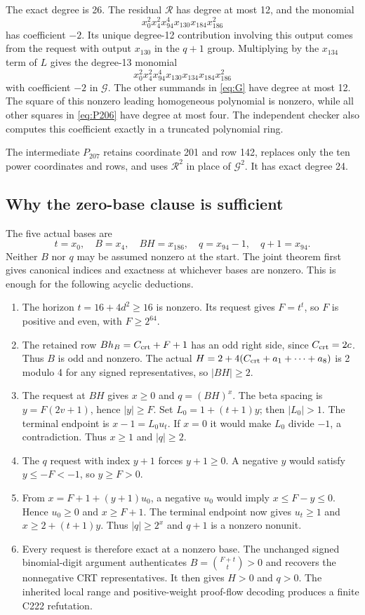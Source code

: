 \documentclass[11pt]{article}
\theoremstyle{definition}\newtheorem{definition}[theorem]{Definition}
\begin{document}
The exact degree is 26. The residual $\mathcal R$ has degree at most 12,
and the monomial
\[
 x_0^2x_4^2x_{94}^4x_{130}x_{184}x_{186}^2
\]
has coefficient $-2$. Its unique degree-12 contribution involving this
output comes from the request with output $x_{130}$ in the $q+1$ group.
Multiplying by the $x_{134}$ term of $L$ gives the degree-13 monomial
\[
 x_0^2x_4^2x_{94}^4x_{130}x_{134}x_{184}x_{186}^2
\]
with coefficient $-2$ in $\mathcal G$. The other summands in
\eqref{eq:G} have degree at most 12. The square of this nonzero leading
homogeneous polynomial is nonzero, while all other squares in
\eqref{eq:P206} have degree at most four. The independent checker also
computes this coefficient exactly in a truncated polynomial ring.

The intermediate $P_{207}$ retains coordinate 201 and row 142, replaces
only the ten power coordinates and rows, and uses $\mathcal R^2$ in
place of $\mathcal G^2$. It has exact degree 24.

\subsection{Why the zero-base clause is sufficient}

The five actual bases are
\[
 t=x_0,\quad B=x_4,\quad BH=x_{186},\quad q=x_{94}-1,
 \quad q+1=x_{94}.
\]
Neither $B$ nor $q$ may be assumed nonzero at the start. The joint
theorem first gives canonical indices and exactness at whichever bases
are nonzero. This is enough for the following acyclic deductions.

\begin{enumerate}
\item The horizon $t=16+4d^2\ge16$ is nonzero. Its request gives
 $F=t^t$, so $F$ is positive and even, with $F\ge2^{64}$.
\item The retained row $Bh_B=C_{\rm crt}+F+1$ has an odd right side,
 since $C_{\rm crt}=2c$. Thus $B$ is odd and nonzero. The actual
 $H=2+4(C_{\rm crt}+a_1+\cdots+a_8)$ is 2 modulo 4 for any signed
 representatives, so $|BH|\ge2$.
\item The request at $BH$ gives $x\ge0$ and $q=(BH)^x$. The beta
 spacing is $y=F(2v+1)$, hence $|y|\ge F$. Set $L_0=1+(t+1)y$;
 then $|L_0|>1$. The terminal endpoint is $x-1=L_0u_t$.
 If $x=0$ it would make $L_0$ divide $-1$, a contradiction.
 Thus $x\ge1$ and $|q|\ge2$.
\item The $q$ request with index $y+1$ forces $y+1\ge0$.
 A negative $y$ would satisfy $y\le-F<-1$, so $y\ge F>0$.
\item From $x=F+1+(y+1)u_0$, a negative $u_0$ would imply
 $x\le F-y\le0$. Hence $u_0\ge0$ and $x\ge F+1$.
 The terminal endpoint now gives $u_t\ge1$ and
 $x\ge2+(t+1)y$. Thus $|q|\ge2^x$ and $q+1$ is a nonzero nonunit.
\item Every request is therefore exact at a nonzero base. The unchanged
 signed binomial-digit argument authenticates
 $B=\binom{F+t}{t}>0$ and recovers the nonnegative CRT representatives.
 It then gives $H>0$ and $q>0$. The inherited local range and
 positive-weight proof-flow decoding produces a finite C222 refutation.
\end{enumerate}
\end{document}
